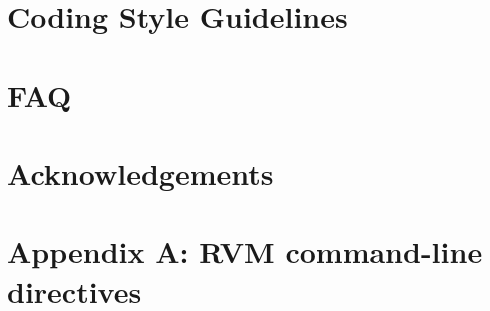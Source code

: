 \documentclass{article}
\begin{document}
\T \newpage
\section{Coding Style Guidelines}


\T \newpage
\section{FAQ}


\T \newpage
\section*{Acknowledgements}


\T \newpage
\T 
\T 

\T \newpage
\section{Appendix A: RVM command-line directives}
\label{appendix:nonadaptive:cmdline}


\W \section*{\indexname}\label{hlxindex}
\W \htmlprintindex
\T \printindex
\end{document}
